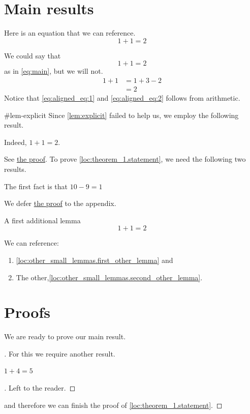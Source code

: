 \documentclass{article}
\begin{document}
\section{Main results}
\label{loc:body.main_results}
Here is an equation that we can reference.
\begin{equation}
\label{eq:main}
1+1 = 2
\end{equation}
\begin{lemma}
We could say that
\begin{equation*}
1+1  = 2
\end{equation*}
as in \autoref{eq:main}, but we will not.
\begin{align}
1+1 & = 1+3-2 \label{eq:aligned_eq:1}\\
& = 2 \label{eq:aligned_eq:2}
\end{align}
Notice that \autoref{eq:aligned_eq:1} and \autoref{eq:aligned_eq:2} follows from arithmetic.
\end{lemma}
{#lem-explicit}
Since \autoref{lem:explicit} failed to help us, we employ the following result.
\begin{theorem}

\label{loc:theorem_1.statement}
Indeed, $1+1  =  2$.
\end{theorem}
See \hyperlink{loc:theorem_1.proof}{the proof}. To prove \autoref{loc:theorem_1.statement}, we need the following two results.
\begin{lemma}

\label{loc:lemma_1.statement}
The first fact is that $10-9 = 1$
\end{lemma}
We defer \hyperlink{loc:lemma_1.proof}{the proof} to the appendix.
\begin{lemma}

\label{loc:other_small_lemmas.first_other_lemma}
A first additional lemma
\begin{equation*}
1+1 = 2
\end{equation*}
\end{lemma}
We can reference: 
\begin{enumerate}
\item \autoref{loc:other_small_lemmas.first_other_lemma} and 
\item The other,\autoref{loc:other_small_lemmas.second_other_lemma}.
\end{enumerate}
\section{Proofs}
\label{loc:body.proofs}
We are ready to prove our main result.
\begin{proof}
[\hypertarget{loc:theorem_1.proof}Proof of \autoref{loc:theorem_1.statement}]For this we require another result.
\begin{proposition}

\label{loc:lemma_2.statement}
$1+4 = 5$
\end{proposition}
\begin{proof}
[\hypertarget{loc:lemma_2.proof}Proof of \autoref{loc:lemma_2.statement}]Left to the reader.
\end{proof}
and therefore we can finish the proof of \autoref{loc:theorem_1.statement}.
\end{proof}
\end{document}
